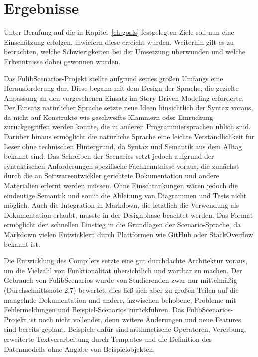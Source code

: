 \chapter{Ergebnisse}\label{ch:ergebnisse}

Unter Berufung auf die in Kapitel~\ref{ch:goals} festgelegten Ziele soll nun eine Einschätzung erfolgen, inwiefern diese erreicht wurden.
Weiterhin gilt es zu betrachten, welche Schwierigkeiten bei der Umsetzung überwunden und welche Erkenntnisse dabei gewonnen wurden.

Das FulibScenarios-Projekt stellte aufgrund seines großen Umfangs eine Herausforderung dar.
Diese begann mit dem Design der Sprache, die gezielte Anpassung an den vorgesehenen Einsatz im Story Driven Modeling erforderte.
Der Einsatz natürlicher Sprache setzte neue Ideen hinsichtlich der Syntax voraus, da nicht auf Konstrukte wie geschweifte Klammern oder Einrückung zurückgegriffen werden konnte, die in anderen Programmiersprachen üblich sind.
Darüber hinaus ermöglicht die natürliche Sprache eine leichte Verständlichkeit für Leser ohne technischen Hintergrund, da Syntax und Semantik aus dem Alltag bekannt sind.
Das Schreiben der Scenarios setzt jedoch aufgrund der syntaktischen Anforderungen spezifische Fachkenntnisse voraus, die zunächst durch die an Softwareentwickler gerichtete Dokumentation und andere Materialien erlernt werden müssen.
Ohne Einschränkungen wären jedoch die eindeutige Semantik und somit die Ableitung von Diagrammen und Tests nicht möglich.
Auch die Integration in Markdown, die letztlich die Verwendung als Dokumentation erlaubt, musste in der Designphase beachtet werden.
Das Format ermöglicht den schnellen Einstieg in die Grundlagen der Scenario-Sprache, da Markdown vielen Entwicklern durch Plattformen wie GitHub oder StackOverflow bekannt ist.

Die Entwicklung des Compilers setzte eine gut durchdachte Architektur voraus, um die Vielzahl von Funktionalität übersichtlich und wartbar zu machen.
Der Gebrauch von FulibScenarios wurde von Studierenden zwar nur mittelmäßig (Durchschnittsnote 2,7) bewertet, dies ließ sich aber zu großen Teilen auf die mangelnde Dokumentation und andere, inzwischen behobene, Probleme mit Fehlermeldungen und Beispiel-Scenarios zurückführen.
Das FulibScenarios-Projekt ist noch nicht vollendet, denn weitere Änderungen und neue Features sind bereits geplant.
Beispiele dafür sind arithmetische Operatoren, Vererbung, erweiterte Textverarbeitung durch Templates und die Definition des Datenmodells ohne Angabe von Beispielobjekten.

